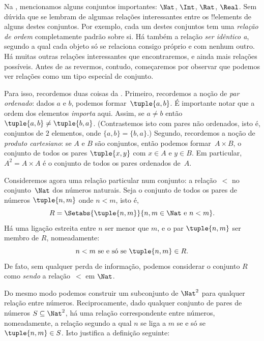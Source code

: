 \documentclass[../../../include/open-logic-section]{subfiles}
\begin{document}

\begin{explain}
Na , mencionamos alguns conjuntos importantes:
$\Nat$, $\Int$, $\Rat$, $\Real$. Sem dúvida que se lembram de algumas
relações interessantes entre os !!{element}s de alguns destes conjuntos.
Por exemplo, cada um destes conjuntos tem uma \emph{relação de ordem}
completamente padrão sobre si. Há também a relação \emph{ser idêntico a},
segundo a qual cada objeto só se relaciona consigo próprio e com nenhum outro. Há
muitas outras relações interessantes que encontraremos, e ainda mais
relações possíveis. Antes de as revermos, contudo, começaremos por
observar que podemos ver relações como um tipo especial de conjunto. 
  
Para isso, recordemos duas coisas da . Primeiro,
recordemos a noção de \emph{par ordenado}: dados $a$ e $b$, podemos
formar~$\tuple{a, b}$. É importante notar que a ordem dos elementos \emph{importa}
aqui. Assim, se $a \neq b$ então $\tuple{a, b} \neq \tuple{b, a}$.
(Contrastemos isto com pares não ordenados, isto é, conjuntos de $2$ elementos, onde
$\{a, b\}=\{b, a\}$.) Segundo, recordemos a noção de \emph{produto
cartesiano}: se $A$ e $B$ são conjuntos, então podemos formar~$A \times B$, o
conjunto de todos os pares $\tuple{x, y}$ com $x \in A$ e $y \in B$. Em
particular, $A^{2}= A \times A$ é o conjunto de todos os pares ordenados
de~$A$.
  
Consideremos agora uma relação particular num conjunto: a relação~$<$
no conjunto~$\Nat$ dos números naturais. Seja o conjunto de todos os
pares de números $\tuple{n, m}$ onde $n<m$, isto é,
\[
  R=\Setabs{\tuple{n, m}}{n, m \in \Nat \text{ e } n<m}.
\]
Há uma ligação estreita entre $n$ ser menor que $m$, e o
par $\tuple{n, m}$ ser membro de $R$, nomeadamente:
\[
      n<m\text{ se e só se }\tuple{n, m} \in R.
\]
De fato, sem qualquer perda de informação, podemos considerar o conjunto $R$
como \emph{sendo} a relação~$<$ em $\Nat$. 

Do mesmo modo podemos construir um subconjunto de $\Nat^{2}$ para qualquer
relação entre números. Reciprocamente, dado qualquer conjunto de pares de
números $S \subseteq \Nat^{2}$, há uma relação correspondente
entre números, nomeadamente, a relação segundo a qual $n$ se liga a $m$ se e só se
$\tuple{n, m} \in S$. Isto justifica a definição seguinte:
\end{explain}
  
\end{document}
